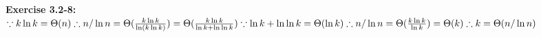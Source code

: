 \documentclass{article}
\begin{document}
\begin{spacing}{2.0}
\noindent
\textbf{Exercise 3.2-8:}\\
$
\because k \ln k = \Theta(n)\\
\therefore n / \ln n = \Theta(\frac{k \ln k}{\ln (k \ln k)}) = \Theta(\frac{k \ln k}{\ln k + \ln \ln k})\\
\because \ln k + \ln \ln k = \Theta(\ln k)\\
\therefore n / \ln n = \Theta(\frac{k \ln k}{\ln k}) = \Theta(k)\\
\therefore k = \Theta(n / \ln n)\\
$
\end{spacing}
\end{document}

